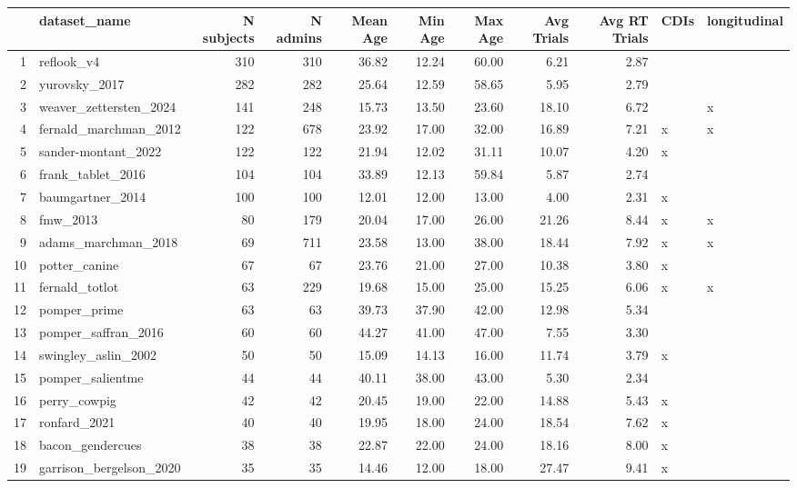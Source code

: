 \documentclass[9pt,twocolumn,twoside,]{pnas-new}
\begin{document}
\begin{table}[ht]
\centering
\begin{tabular}{rlrrrrrrrll}
  \hline
 & dataset\_name & N subjects & N admins & Mean Age & Min Age & Max Age & Avg Trials & Avg RT Trials & CDIs & longitudinal \\ 
  \hline
1 & reflook\_v4 & 310 & 310 & 36.82 & 12.24 & 60.00 & 6.21 & 2.87 &  &  \\ 
  2 & yurovsky\_2017 & 282 & 282 & 25.64 & 12.59 & 58.65 & 5.95 & 2.79 &  &  \\ 
  3 & weaver\_zettersten\_2024 & 141 & 248 & 15.73 & 13.50 & 23.60 & 18.10 & 6.72 &  & x \\ 
  4 & fernald\_marchman\_2012 & 122 & 678 & 23.92 & 17.00 & 32.00 & 16.89 & 7.21 & x & x \\ 
  5 & sander-montant\_2022 & 122 & 122 & 21.94 & 12.02 & 31.11 & 10.07 & 4.20 & x &  \\ 
  6 & frank\_tablet\_2016 & 104 & 104 & 33.89 & 12.13 & 59.84 & 5.87 & 2.74 &  &  \\ 
  7 & baumgartner\_2014 & 100 & 100 & 12.01 & 12.00 & 13.00 & 4.00 & 2.31 & x &  \\ 
  8 & fmw\_2013 &  80 & 179 & 20.04 & 17.00 & 26.00 & 21.26 & 8.44 & x & x \\ 
  9 & adams\_marchman\_2018 &  69 & 711 & 23.58 & 13.00 & 38.00 & 18.44 & 7.92 & x & x \\ 
  10 & potter\_canine &  67 &  67 & 23.76 & 21.00 & 27.00 & 10.38 & 3.80 & x &  \\ 
  11 & fernald\_totlot &  63 & 229 & 19.68 & 15.00 & 25.00 & 15.25 & 6.06 & x & x \\ 
  12 & pomper\_prime &  63 &  63 & 39.73 & 37.90 & 42.00 & 12.98 & 5.34 &  &  \\ 
  13 & pomper\_saffran\_2016 &  60 &  60 & 44.27 & 41.00 & 47.00 & 7.55 & 3.30 &  &  \\ 
  14 & swingley\_aslin\_2002 &  50 &  50 & 15.09 & 14.13 & 16.00 & 11.74 & 3.79 & x &  \\ 
  15 & pomper\_salientme &  44 &  44 & 40.11 & 38.00 & 43.00 & 5.30 & 2.34 &  &  \\ 
  16 & perry\_cowpig &  42 &  42 & 20.45 & 19.00 & 22.00 & 14.88 & 5.43 & x &  \\ 
  17 & ronfard\_2021 &  40 &  40 & 19.95 & 18.00 & 24.00 & 18.54 & 7.62 & x &  \\ 
  18 & bacon\_gendercues &  38 &  38 & 22.87 & 22.00 & 24.00 & 18.16 & 8.00 & x &  \\ 
  19 & garrison\_bergelson\_2020 &  35 &  35 & 14.46 & 12.00 & 18.00 & 27.47 & 9.41 & x &  \\ 

\end{tabular}
\end{table}
\end{document}
